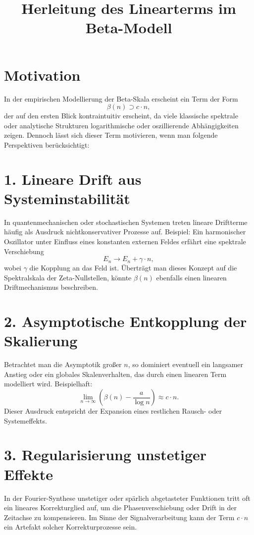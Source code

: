 \documentclass[a4paper,12pt]{article}
\title{Herleitung des Linearterms im Beta-Modell}
\author{}
\date{}
\begin{document}
\maketitle

\section*{Motivation}

In der empirischen Modellierung der Beta-Skala erscheint ein Term der Form
\[
\beta(n) \supset c \cdot n,
\]
der auf den ersten Blick kontraintuitiv erscheint, da viele klassische spektrale oder analytische Strukturen logarithmische oder oszillierende Abhängigkeiten zeigen. Dennoch lässt sich dieser Term motivieren, wenn man folgende Perspektiven berücksichtigt:

\section*{1. Lineare Drift aus Systeminstabilität}

In quantenmechanischen oder stochastischen Systemen treten lineare Driftterme häufig als Ausdruck nichtkonservativer Prozesse auf. Beispiel: Ein harmonischer Oszillator unter Einfluss eines konstanten externen Feldes erfährt eine spektrale Verschiebung
\[
E_n \rightarrow E_n + \gamma \cdot n,
\]
wobei \(\gamma\) die Kopplung an das Feld ist. Überträgt man dieses Konzept auf die Spektralskala der Zeta-Nullstellen, könnte \(\beta(n)\) ebenfalls einen linearen Driftmechanismus beschreiben.

\section*{2. Asymptotische Entkopplung der Skalierung}

Betrachtet man die Asymptotik großer \(n\), so dominiert eventuell ein langsamer Anstieg oder ein globales Skalenverhalten, das durch einen linearen Term modelliert wird. Beispielhaft:
\[
\lim_{n \to \infty} \left( \beta(n) - \frac{a}{\log n} \right) \approx c \cdot n.
\]
Dieser Ausdruck entspricht der Expansion eines restlichen Rausch- oder Systemeffekts.

\section*{3. Regularisierung unstetiger Effekte}

In der Fourier-Synthese unstetiger oder spärlich abgetasteter Funktionen tritt oft ein lineares Korrekturglied auf, um die Phasenverschiebung oder Drift in der Zeitachse zu kompensieren. Im Sinne der Signalverarbeitung kann der Term \(c \cdot n\) ein Artefakt solcher Korrekturprozesse sein.
\end{document}
